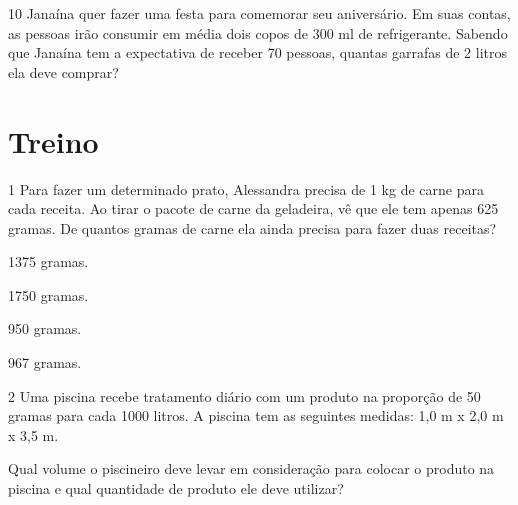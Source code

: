\begin{emptybox}

\end{emptybox}

\num{10} Janaína quer fazer uma festa para comemorar seu aniversário. Em suas
contas, as pessoas irão consumir em média dois copos de 300 ml de refrigerante.
Sabendo que Janaína tem a expectativa de receber 70 pessoas, quantas garrafas de
2 litros ela deve comprar?

\begin{emptybox}
\end{emptybox}

\section*{Treino}

\num{1} Para fazer um determinado prato, Alessandra precisa de 1 kg de carne
para cada receita. Ao tirar o pacote de carne da geladeira, vê que ele
tem apenas 625 gramas. De quantos gramas de carne ela ainda precisa para
fazer duas receitas?

\begin{escolha}

  \item 1375 gramas.

  \item 1750 gramas.

  \item 950 gramas.

  \item 967 gramas.

\end{escolha}

\num{2} Uma piscina recebe tratamento diário com um produto na proporção de
50 gramas para cada 1000 litros. A piscina tem as seguintes medidas:
1,0 m x 2,0 m x 3,5 m. 

Qual volume o piscineiro deve levar em
consideração para colocar o produto na piscina e qual quantidade de
produto ele deve utilizar?

